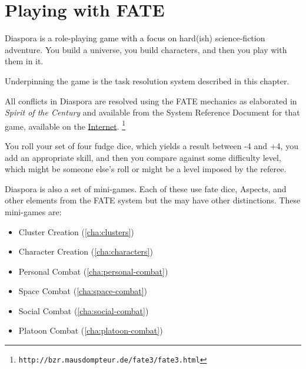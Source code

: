 \chapter{Playing with FATE}
\label{cha:playing-with-fate}

Diaspora is a role-playing game with a focus on hard(ish) science-fiction adventure. You build a universe, you build characters, and then you play with them in it.

Underpinning the game is the task resolution system described in this chapter.

All conflicts in Diaspora are resolved using the FATE mechanics as elaborated in \emph{Spirit of the Century} and available from the System Reference Document for that game, available on the \href{http://bzr.mausdompteur.de/fate3/fate3.html}{Internet}.%
\footnote{ \texttt{http://bzr.mausdompteur.de/fate3/fate3.html} }

You roll your set of four fudge dice, which yields a result between -4 and +4, you add an appropriate skill, and then you compare against some difficulty level, which might be someone else's roll or might be a level imposed by the referee.



Diaspora is also a set of mini-games. Each of these use fate dice, Aspects, and other elements from the FATE system but the may have other distinctions.  These mini-games are:


\begin{itemize}
\item Cluster Creation (\autoref{cha:clusters})
\item Character Creation (\autoref{cha:characters})
\item Personal Combat (\autoref{cha:personal-combat})
\item Space Combat (\autoref{cha:space-combat})
\item Social Combat (\autoref{cha:social-combat})
\item Platoon Combat (\autoref{cha:platoon-combat})
\end{itemize}


% 








